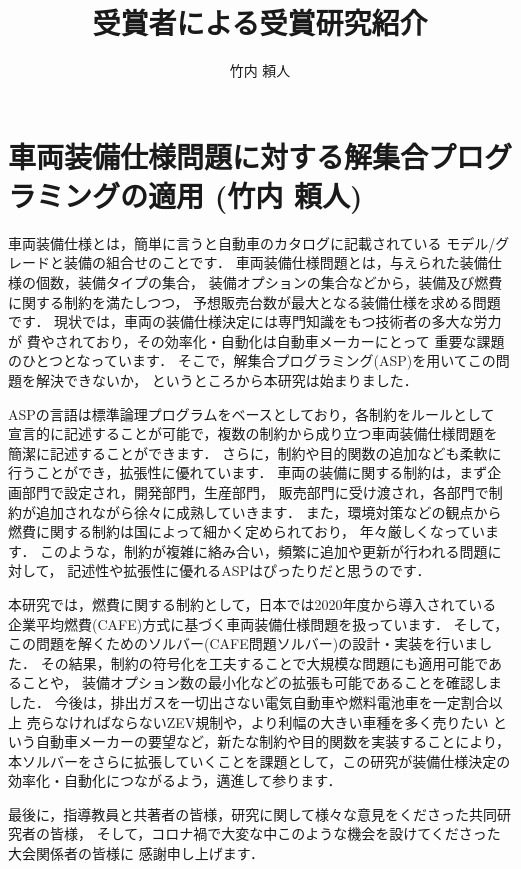 \documentclass[T]{compsoft}
\begin{document}
\title{受賞者による受賞研究紹介}

\author{竹内 頼人}
\maketitle 
\section{車両装備仕様問題に対する解集合プログラミングの適用 (竹内 頼人)}
車両装備仕様とは，簡単に言うと自動車のカタログに記載されている
モデル/グレードと装備の組合せのことです．
車両装備仕様問題とは，与えられた装備仕様の個数，装備タイプの集合，
装備オプションの集合などから，装備及び燃費に関する制約を満たしつつ，
予想販売台数が最大となる装備仕様を求める問題です．
現状では，車両の装備仕様決定には専門知識をもつ技術者の多大な労力が
費やされており，その効率化・自動化は自動車メーカーにとって
重要な課題のひとつとなっています．
そこで，解集合プログラミング(ASP)を用いてこの問題を解決できないか，
というところから本研究は始まりました．

ASPの言語は標準論理プログラムをベースとしており，各制約をルールとして
宣言的に記述することが可能で，複数の制約から成り立つ車両装備仕様問題を
簡潔に記述することができます．
さらに，制約や目的関数の追加なども柔軟に行うことができ，拡張性に優れています．
車両の装備に関する制約は，まず企画部門で設定され，開発部門，生産部門，
販売部門に受け渡され，各部門で制約が追加されながら徐々に成熟していきます．
また，環境対策などの観点から燃費に関する制約は国によって細かく定められており，
年々厳しくなっています．
このような，制約が複雑に絡み合い，頻繁に追加や更新が行われる問題に対して，
記述性や拡張性に優れるASPはぴったりだと思うのです．

本研究では，燃費に関する制約として，日本では2020年度から導入されている
企業平均燃費(CAFE)方式に基づく車両装備仕様問題を扱っています．
そして，この問題を解くためのソルバー(CAFE問題ソルバー)の設計・実装を行いました．
その結果，制約の符号化を工夫することで大規模な問題にも適用可能であることや，
装備オプション数の最小化などの拡張も可能であることを確認しました．
今後は，排出ガスを一切出さない電気自動車や燃料電池車を一定割合以上
売らなければならないZEV規制や，より利幅の大きい車種を多く売りたい
という自動車メーカーの要望など，新たな制約や目的関数を実装することにより，
本ソルバーをさらに拡張していくことを課題として，この研究が装備仕様決定の
効率化・自動化につながるよう，邁進して参ります．


最後に，指導教員と共著者の皆様，研究に関して様々な意見をくださった共同研究者の皆様，
そして，コロナ禍で大変な中このような機会を設けてくださった大会関係者の皆様に
感謝申し上げます．
\end{document}

